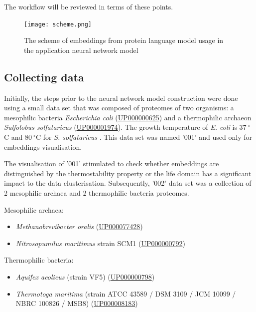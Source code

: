 \documentclass[12pt]{article}
\begin{document}
	The workflow will be reviewed in terms of these points.

	\begin{figure}[h!]
		\centering
		\texttt{[image: scheme.png]}

		\caption{The scheme of embeddings from protein language model usage in the 
		application neural network model}
		\label{figure:EmbeddingsUsageScheme}
	\end{figure}

	\subsection{Collecting data}

	Initially, the steps prior to the neural network model construction 
	were done using a small data set that was composed of proteomes of two 
	organisms: a mesophilic bacteria \textit{Escherichia coli} 
	(\href{https://www.uniprot.org/proteomes/UP000000625}{UP000000625}) and a 
	thermophilic archaeon \textit{Sulfolobus solfataricus} 
	(\href{https://www.uniprot.org/proteomes/UP000001974}{UP000001974}). The 
	growth temperature of \textit{E. coli} is $37\ ^\circ$C \cite{jang2017environmental}
	and $80\ ^\circ$C for \textit{S. solfataricus} \cite{zaparty2010hot}. This 
	data set was named '001' and used only for embeddings visualisation.

	The visualisation of '001' stimulated to check whether embeddings are 
	distinguished by the thermostability property or the life domain has a
	significant impact to the data clusterisation. Subsequently, '002' data set 
	was a collection of 2 mesophilic archaea and 2 thermophilic bacteria
	proteomes.

	\vspace*{0.5cm}

	Mesophilic archaea:

	\begin{itemize}
		\item \textit{Methanobrevibacter oralis} 
		(\href{https://www.uniprot.org/proteomes/UP000077428}{UP000077428})
		\item \textit{Nitrosopumilus maritimus} strain SCM1 (\href{https://www.uniprot.org/proteomes/UP000000792}{UP000000792})
	\end{itemize}

	Thermophilic bacteria:

	\begin{itemize}
		\item \textit{Aquifex aeolicus} (strain VF5)
		(\href{https://www.uniprot.org/proteomes/UP000000798}{UP000000798})
		\item \textit{Thermotoga maritima} 
		(strain ATCC 43589 / DSM 3109 / JCM 10099 / NBRC 100826 / MSB8) 
		(\href{https://www.uniprot.org/proteomes/UP000008183}{UP000008183})
	\end{itemize}
\end{document}
